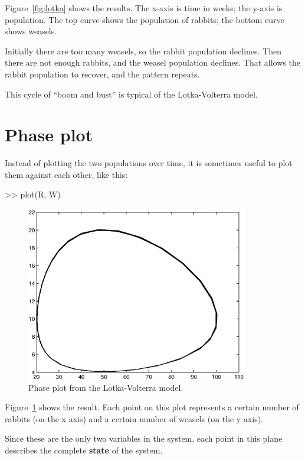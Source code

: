 \documentclass[
]{book}
\numberwithin{Answer}{chapter}
\numberwithin{Exercise}{chapter}
\begin{document}
Figure~\ref{fig:lotka} shows the results. The x-axis is time in weeks; the y-axis is population.  The top curve shows the population of rabbits; the bottom curve shows weasels.


Initially there are too many weasels, so the rabbit population declines.  Then there are not enough rabbits, and the weasel population declines.  That allows the rabbit population to recover, and the pattern repeats.

This cycle of ``boom and bust'' is typical of the Lotka-Volterra model.


\section{Phase plot}

Instead of plotting the two populations over time, it is sometimes useful to plot them against each other, like this:

\begin{code}
>> plot(R, W)
\end{code}

\begin{figure}
\centerline{\includegraphics[height=3in]{book/figs/phase.eps}}
\caption{Phase plot from the Lotka-Volterra model.}
\label{fig:phase}
\end{figure}

Figure~\ref{fig:phase} shows the result.  Each point on this plot represents a certain number of rabbits (on the
x axis) and a certain number of weasels (on the y axis).

Since these are the only two variables in the system, each point in
this plane describes the complete {\bf state} of the system.

\end{document}

